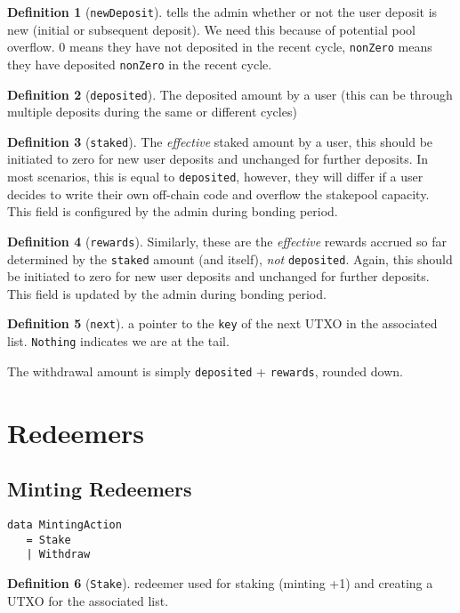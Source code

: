 \documentclass[10pt, a4paper]{article}
\theoremstyle{definition}
\newtheorem{definition}{Definition}[section]
\begin{document}
\begin{definition}[\texttt{newDeposit}]\label{def:newDeposit} tells the admin whether or not the user deposit is new (initial or subsequent deposit). We need this because of potential pool overflow. 0 means they have not deposited in the recent cycle, \texttt{nonZero} means they have deposited \texttt{nonZero} in the recent cycle.
\end{definition}

\begin{definition}[\texttt{deposited}]\label{def:deposited}
The deposited amount by a user (this can be through multiple deposits during the same or different cycles)
\end{definition}

\begin{definition}[\texttt{staked}]\label{def:staked}
The \textit{effective} staked amount by a user, this should be initiated to zero for new user deposits and unchanged for further deposits. In most scenarios, this is equal to \texttt{deposited}, however, they will differ if a user decides to write their own off-chain code and overflow the stakepool capacity. This field is configured by the admin during bonding period.
\end{definition}

\begin{definition}[\texttt{rewards}]\label{def:rewards}
Similarly, these are the \textit{effective} rewards accrued so far determined by the \texttt{staked} amount (and itself), \textit{not}
 \texttt{deposited}. Again, this should be initiated to zero for new user deposits and unchanged for further deposits. This field is updated by the admin during bonding period.
\end{definition}

\begin{definition}[\texttt{next}]\label{def:next}
a pointer to the \texttt{key} of the next UTXO in the associated list. \texttt{Nothing} indicates we are at the tail.
\end{definition}

The withdrawal amount is simply \texttt{deposited} + \texttt{rewards}, rounded down.

\section{Redeemers}
\subsection{Minting Redeemers}
\begin{verbatim}
data MintingAction
   = Stake
   | Withdraw
\end{verbatim}
\begin{definition}[\texttt{Stake}]\label{def:Stake} redeemer used for staking (minting +1) and creating a UTXO for the associated list.
\end{definition}
\end{document}
